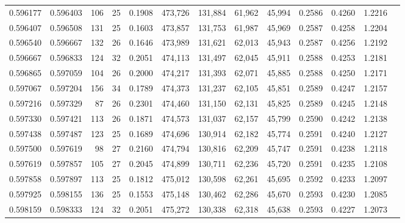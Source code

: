 \begin{tabular}{rrrrrrrrrrrrr}
0.596177 & 0.596403 &    106 &    25 &                                     0.1908 & 473,726 & 131,884 &  61,962 &  45,994 & 0.2586 & 0.4260 & 1.2216 \\
0.596407 & 0.596508 &    131 &    25 &                                     0.1603 & 473,857 & 131,753 &  61,987 &  45,969 & 0.2587 & 0.4258 & 1.2204 \\
0.596540 & 0.596667 &    132 &    26 &                                     0.1646 & 473,989 & 131,621 &  62,013 &  45,943 & 0.2587 & 0.4256 & 1.2192 \\
0.596667 & 0.596833 &    124 &    32 &                                     0.2051 & 474,113 & 131,497 &  62,045 &  45,911 & 0.2588 & 0.4253 & 1.2181 \\
0.596865 & 0.597059 &    104 &    26 &                                     0.2000 & 474,217 & 131,393 &  62,071 &  45,885 & 0.2588 & 0.4250 & 1.2171 \\
0.597067 & 0.597204 &    156 &    34 &                                     0.1789 & 474,373 & 131,237 &  62,105 &  45,851 & 0.2589 & 0.4247 & 1.2157 \\
0.597216 & 0.597329 &     87 &    26 &                                     0.2301 & 474,460 & 131,150 &  62,131 &  45,825 & 0.2589 & 0.4245 & 1.2148 \\
0.597330 & 0.597421 &    113 &    26 &                                     0.1871 & 474,573 & 131,037 &  62,157 &  45,799 & 0.2590 & 0.4242 & 1.2138 \\
0.597438 & 0.597487 &    123 &    25 &                                     0.1689 & 474,696 & 130,914 &  62,182 &  45,774 & 0.2591 & 0.4240 & 1.2127 \\
0.597500 & 0.597619 &     98 &    27 &                                     0.2160 & 474,794 & 130,816 &  62,209 &  45,747 & 0.2591 & 0.4238 & 1.2118 \\
0.597619 & 0.597857 &    105 &    27 &                                     0.2045 & 474,899 & 130,711 &  62,236 &  45,720 & 0.2591 & 0.4235 & 1.2108 \\
0.597858 & 0.597897 &    113 &    25 &                                     0.1812 & 475,012 & 130,598 &  62,261 &  45,695 & 0.2592 & 0.4233 & 1.2097 \\
0.597925 & 0.598155 &    136 &    25 &                                     0.1553 & 475,148 & 130,462 &  62,286 &  45,670 & 0.2593 & 0.4230 & 1.2085 \\
0.598159 & 0.598333 &    124 &    32 &                                     0.2051 & 475,272 & 130,338 &  62,318 &  45,638 & 0.2593 & 0.4227 & 1.2073 \\

\end{tabular}
